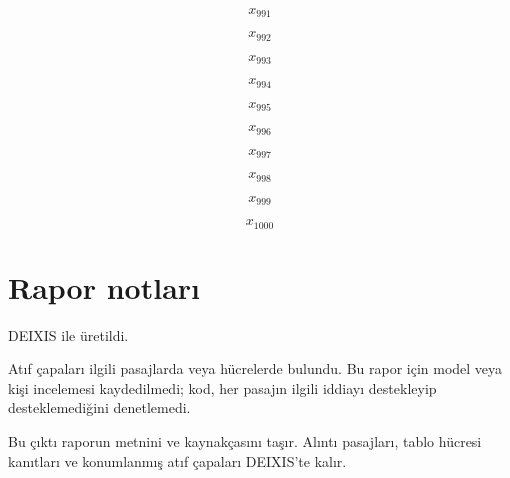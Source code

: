 \documentclass[journal]{IEEEtran}
\begin{document}
\begin{equation}
\label{eq:EQ991}
x_{991}
\end{equation}
\cite{Synth26}

\begin{equation}
\label{eq:EQ992}
x_{992}
\end{equation}
\cite{Synth26}

\begin{equation}
\label{eq:EQ993}
x_{993}
\end{equation}
\cite{Synth26}

\begin{equation}
\label{eq:EQ994}
x_{994}
\end{equation}
\cite{Synth26}

\begin{equation}
\label{eq:EQ995}
x_{995}
\end{equation}
\cite{Synth26}

\begin{equation}
\label{eq:EQ996}
x_{996}
\end{equation}
\cite{Synth26}

\begin{equation}
\label{eq:EQ997}
x_{997}
\end{equation}
\cite{Synth26}

\begin{equation}
\label{eq:EQ998}
x_{998}
\end{equation}
\cite{Synth26}

\begin{equation}
\label{eq:EQ999}
x_{999}
\end{equation}
\cite{Synth26}

\begin{equation*}
x_{1000}
\end{equation*}
\cite{Synth26}

\section*{Rapor notları}

DEIXIS ile üretildi.

Atıf çapaları ilgili pasajlarda veya hücrelerde bulundu. Bu rapor için model veya kişi incelemesi kaydedilmedi; kod, her pasajın ilgili iddiayı destekleyip desteklemediğini denetlemedi.

Bu çıktı raporun metnini ve kaynakçasını taşır. Alıntı pasajları, tablo hücresi kanıtları ve konumlanmış atıf çapaları DEIXIS'te kalır.




\end{document}
